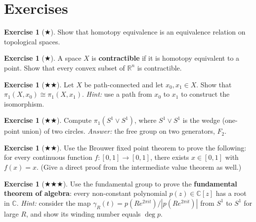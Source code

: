 \documentclass[11pt,a4paper,twoside]{book}
\theoremstyle{remark}
\theoremstyle{definition}
\newtheorem{exerciseplain}[theorem]{Exercise}
\theoremstyle{definition}
\newenvironment{exercise}[1][]{%
  \begin{exerciseplain}[#1]
}{%
  \end{exerciseplain}
}
\begin{document}
\section{Exercises}
\label{sec:algtop-exercises}

\begin{exercise}[$\bigstar$]
\label{exo:algtop-1}
Show that homotopy equivalence is an equivalence relation on topological
spaces.
\end{exercise}

\begin{exercise}[$\bigstar$]
\label{exo:algtop-2}
A space $X$ is \textbf{contractible} if it is homotopy equivalent to a
point.  Show that every convex subset of $\mathbb{R}^n$ is contractible.
\end{exercise}

\begin{exercise}[$\bigstar\bigstar$]
\label{exo:algtop-3}
Let $X$ be path-connected and let $x_0,x_1\in X$.  Show that
$\pi_1(X,x_0)\cong\pi_1(X,x_1)$.
\textit{Hint:} use a path from $x_0$ to $x_1$ to construct the
isomorphism.
\end{exercise}

\begin{exercise}[$\bigstar\bigstar$]
\label{exo:algtop-4}
Compute $\pi_1(S^1\vee S^1)$, where $S^1\vee S^1$ is the wedge
(one-point union) of two circles.
\textit{Answer:} the free group on two generators, $F_2$.
\end{exercise}

\begin{exercise}[$\bigstar\bigstar$]
\label{exo:algtop-5}
Use the Brouwer fixed point theorem to prove the following: for every
continuous function $f\colon[0,1]\to[0,1]$, there exists $x\in[0,1]$
with $f(x)=x$.  (Give a direct proof from the intermediate value
theorem as well.)
\end{exercise}

\begin{exercise}[$\bigstar\bigstar\bigstar$]
\label{exo:algtop-6}
Use the fundamental group to prove the \textbf{fundamental theorem of
algebra}: every non-constant polynomial $p(z)\in\mathbb{C}[z]$ has a
root in $\mathbb{C}$.
\textit{Hint:} consider the map $\gamma_R(t) = p(Re^{2\pi it})/
|p(Re^{2\pi it})|$ from $S^1$ to $S^1$ for large $R$, and show its
winding number equals $\deg p$.
\end{exercise}
\end{document}
